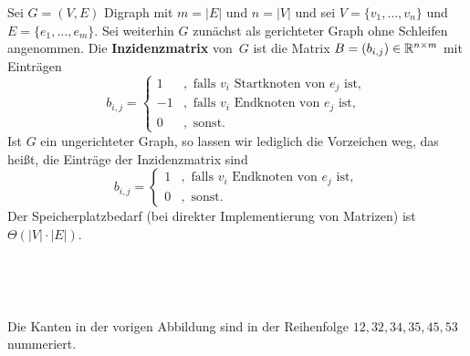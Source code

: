 \begin{defn}
Sei $G=(V,E)$ Digraph mit $m=|E|$ und $n=|V|$ und sei $V=\{v_1,\ldots,v_n\}$ und $E=\{e_1,\ldots,e_m\}$.
Sei weiterhin $G$ zunächst als gerichteter Graph ohne Schleifen angenommen.
Die \textbf{Inzidenzmatrix} von~$G$ ist die Matrix $B=(b_{i,j}) \in \mathbb{R}^{n \times m}$ mit Einträgen
\[
b_{i,j} = \begin{cases}1&,\text{ falls }v_i\text{ Startknoten von }e_j\text{ ist},\\ -1&,\text{ falls }v_i\text{ Endknoten von }e_j\text{ ist},\\ 0&,\text{ sonst}.\end{cases}
\]
Ist $G$ ein ungerichteter Graph, so lassen wir lediglich die Vorzeichen weg, das heißt, die Einträge der Inzidenzmatrix sind
\[
b_{i,j} = \begin{cases}1&,\text{ falls }v_i\text{ Endknoten von }e_j\text{ ist},\\ 0&,\text{ sonst}.\end{cases}
\]
Der Speicherplatzbedarf (bei direkter Implementierung von Matrizen) ist $\Theta(|V|\cdot|E|)$.
\end{defn} 

\begin{bsp} \ 
\begin{center}
\hfill
{}
\hfill
{}
\hfill\,
\end{center}

Die Kanten in der vorigen Abbildung sind in der Reihenfolge $12,32,34,35,45,53$ nummeriert.
\end{bsp} 